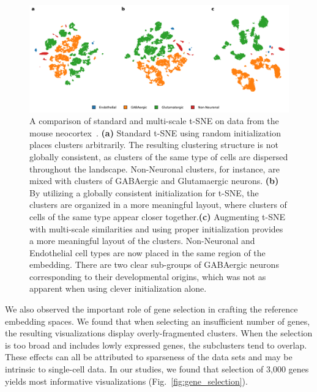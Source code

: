 \documentclass[runningheads]{llncs}
\begin{document}
\begin{figure}[htbp]
  \includegraphics[width=\textwidth]{tasic_multiscale.pdf}
  \caption{A comparison of standard and multi-scale t-SNE on data from the
   mouse neocortex~\cite{Tasic2018}. {\bf (a)} Standard t-SNE using random
   initialization places clusters arbitrarily. The resulting clustering
   structure is not globally consistent, as clusters of the same type of
   cells are dispersed throughout the landscape. Non-Neuronal clusters, for
   instance, are mixed with clusters of GABAergic and Glutamaergic neurons.
   {\bf (b)} By utilizing a globally consistent initialization for t-SNE, the
   clusters are organized in a more meaningful layout, where clusters of
   cells of the same type appear closer together.{\bf (c)} Augmenting t-SNE
   with multi-scale similarities and using proper initialization provides a
   more meaningful layout of the clusters. Non-Neuronal and Endothelial cell
   types are now placed in the same region of the embedding. There are two
   clear sub-groups of GABAergic neurons corresponding to their developmental
   origins, which was not as apparent when using clever initialization
   alone.}
  \label{fig:multiscale}
\end{figure}


We also observed the important role of gene selection in crafting the
reference embedding spaces. We found that when selecting an insufficient
number of genes, the resulting visualizations display overly-fragmented
clusters. When the selection is too broad and includes lowly expressed genes,
the subclusters tend to overlap. These effects can all be attributed to
sparseness of the data sets and may be intrinsic to single-cell data. In our
studies, we found that selection of 3,000 genes yields most informative
visualizations (Fig.~\ref{fig:gene_selection}).
\end{document}

